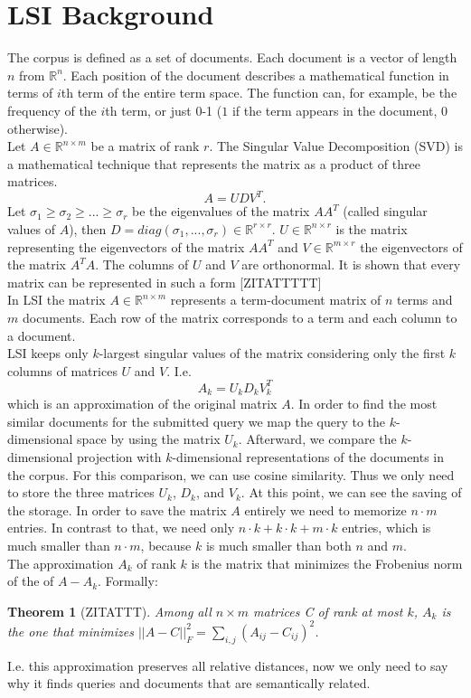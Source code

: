 \documentclass[a4paper,11pt,DIV=15]{scrartcl} %
\theoremstyle{plain}
\newtheorem{theorem}{Theorem}
\theoremstyle{definition}
\begin{document}
 

\section{LSI Background} %
The corpus is defined as a set of documents. Each document is a vector of length $n$ from $\mathbb{R}^n$. Each position of the document describes a mathematical function in terms of $i$th term of the entire term space. The function can, for example, be the frequency of the $i$th term, or just 0-1 ($1$ if the term appears in the document, $0$ otherwise).\\
Let $A \in \mathbb{R}^{n \times m}$ be a matrix of rank $r$. The Singular Value Decomposition (SVD) is a mathematical technique that represents the matrix as a product of three matrices.
\[
A = UDV^T.
\]
Let $\sigma_1 \geq \sigma_2 \geq ...\geq \sigma_r$ be the eigenvalues of the matrix $AA^T$ (called singular values of $A$), then $D = diag(\sigma_1,...,\sigma_r) \in \mathbb{R}^{r \times r}$. $U \in \mathbb{R}^{n \times r}$ is the matrix representing the eigenvectors of the matrix $AA^T$ and $V \in \mathbb{R}^{m \times r}$ the eigenvectors of the matrix $A^TA$. The columns of $U$ and $V$ are orthonormal. It is shown that every matrix can be represented in such a form [ZITATTTTT]\\
In LSI the matrix $A \in \mathbb{R}^{n \times m}$ represents a term-document matrix of $n$ terms and $m$ documents. Each row of the matrix corresponds to a term and each column to a document.\\
LSI keeps only $k$-largest singular values of the matrix considering only the first $k$ columns of matrices $U$ and $V$. I.e.
\[
A_k = U_kD_kV_k^T
\]
which is an approximation of the original matrix $A$. 
In order to find the most similar documents for the submitted query we map the query to the $k$-dimensional space by using the matrix $U_k$. Afterward, we compare the $k$-dimensional projection with $k$-dimensional representations of the documents in the corpus. For this comparison, we can use cosine similarity. Thus we only need to store the three matrices $U_k$, $D_k$, and $V_k$.
At this point, we can see the saving of the storage. In order to save the matrix $A$ entirely we need to memorize $n \cdot m$ entries. In contrast to that, we need only $n \cdot k + k\cdot k + m \cdot k$ entries, which is much smaller than  $n \cdot m$, because $k$ is much smaller than both $n$ and $m$.\\
The approximation $A_k$ of rank $k$ is the matrix that minimizes the Frobenius norm of the  of $A - A_k$. Formally:
\begin{theorem}
	[ZITATTT]Among all $n \times m$ matrices C of rank at most $k$, $A_k$ is the one that minimizes $||A - C||_F^2 = \sum_{i,j}(A_{ij} - C_{ij})^2$.
\end{theorem}
I.e. this approximation preserves all relative distances, now we only need to say why it finds queries and documents that are semantically related.
\end{document}
